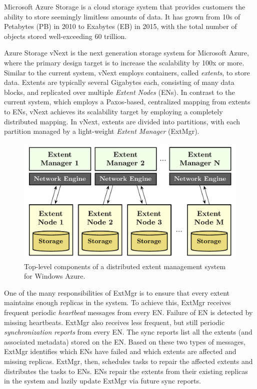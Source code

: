 Microsoft Azure Storage is a cloud storage system that provides customers the ability to store seemingly limitless amounts of data. It has grown from 10s of Petabytes (PB) in 2010 to Exabytes (EB) in 2015, with the total number of objects stored well-exceeding 60 trillion.

Azure Storage vNext is the next generation storage system for Microsoft Azure, where the primary design target is to increase the scalability by 100x or more. Similar to the current system, vNext employs containers, called {\em extents}, to store data. Extents are typically several Gigabytes each, consisting of many data blocks, and replicated over multiple {\em Extent Nodes} (ENs). In contrast to the current system, which employs a Paxos-based, centralized mapping from extents to ENs, vNext achieves its scalability target by employing a completely distributed mapping. In vNext, extents are divided into partitions, with each partition managed by a light-weight {\em Extent Manager} (ExtMgr).

\begin{figure}[t]
\centering
\includegraphics[width=\linewidth]{img/azurestore}
\caption{Top-level components of a distributed extent management system for Windows Azure.}
\label{fig:azurestore}
\end{figure}

One of the many responsibilities of ExtMgr is to ensure that every extent maintains enough replicas in the system. To achieve this, ExtMgr receives frequent periodic \emph{heartbeat} messages from every EN. Failure of EN is detected by missing heartbeats. ExtMgr also receives less frequent, but still periodic {\em synchronization reports} from every EN. The sync reports list all the extents (and associated metadata) stored on the EN. Based on these two types of messages, ExtMgr identifies which ENs have failed and which extents are affected and missing replicas. ExtMgr, then, schedules tasks to repair the affected extents and distributes the tasks to ENs. ENs repair the extents from their existing replicas in the system and lazily update ExtMgr via future sync reports.

